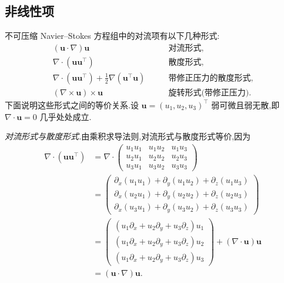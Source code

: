 \subsection{非线性项}\label{subsec:steady-ns-nonlinear-term}

\begin{note}\label{note:steady-ns-convection-forms}
不可压缩 Navier--Stokes 方程组中的对流项有以下几种形式:
\begin{align*}
  (\bm{u}\cdot\nabla)\bm{u}
    &\qquad\text{对流形式},\\
  \nabla\cdot(\bm{u}\bm{u}^{\top})
    &\qquad\text{散度形式},\\
  \nabla\cdot(\bm{u}\bm{u}^{\top})
    +\frac12\nabla(\bm{u}^{\top}\bm{u})
    &\qquad\text{带修正压力的散度形式},\\
  (\nabla\times\bm{u})\times\bm{u}
    &\qquad\text{旋转形式(带修正压力)}.
\end{align*}
下面说明这些形式之间的等价关系.设 $\bm{u}=(u_1,u_2,u_3)^{\top}$ 弱可微且弱无散,即 $\nabla\cdot\bm{u}=0$ 几乎处处成立.

\emph{对流形式与散度形式.}由乘积求导法则,对流形式与散度形式等价,因为
\begin{equation}\label{eq:steady-ns-convective-divergence-identity}
\begin{aligned}
  \nabla\cdot(\bm{u}\bm{u}^{\top})
  &=\nabla\cdot
    \begin{pmatrix}
      u_1u_1&u_1u_2&u_1u_3\\
      u_2u_1&u_2u_2&u_2u_3\\
      u_3u_1&u_3u_2&u_3u_3
    \end{pmatrix}\\
  &=\begin{pmatrix}
      \partial_x(u_1u_1)+\partial_y(u_1u_2)+\partial_z(u_1u_3)\\
      \partial_x(u_2u_1)+\partial_y(u_2u_2)+\partial_z(u_2u_3)\\
      \partial_x(u_3u_1)+\partial_y(u_3u_2)+\partial_z(u_3u_3)
    \end{pmatrix}\\
  &=\begin{pmatrix}
      (u_1\partial_x+u_2\partial_y+u_3\partial_z)u_1\\
      (u_1\partial_x+u_2\partial_y+u_3\partial_z)u_2\\
      (u_1\partial_x+u_2\partial_y+u_3\partial_z)u_3
    \end{pmatrix}
    +(\nabla\cdot\bm{u})\bm{u}\\
  &=(\bm{u}\cdot\nabla)\bm{u}.
\end{aligned}
\end{equation}


\end{note}
